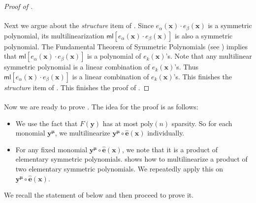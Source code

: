 \documentclass[11pt]{article}
\newcommand{\ml}{\mathsf{ml}}
\begin{document}
\begin{proof}[Proof of ]
\paragraph{}Next we argue about the \emph{structure} item of . Since $e_{\alpha}(\mathbf{x}) \cdot e_{\beta}(\mathbf{x})$ is a symmetric polynomial, its multilinearization $\ml[e_{\alpha}(\mathbf{x}) \cdot e_{\beta}(\mathbf{x})]$ is also a symmetric polynomial. The Fundamental Theorem of Symmetric Polynomials (see ) implies that $\ml[e_{\alpha}(\mathbf{x}) \cdot e_{\beta}(\mathbf{x})]$ is a polynomial of $e_{k}(\mathbf{x})$'s. Note that any multilinear symmetric polynomial is a linear combination of $e_{k}(\mathbf{x})$'s. Thus $\ml[e_{\alpha}(\mathbf{x}) \cdot e_{\beta}(\mathbf{x})]$ is a linear combination of $e_{k}(\mathbf{x})$'s. This finishes the \emph{structure} item of . This finishes the proof of .
\end{proof}




\paragraph{}Now we are ready to prove . The idea for the proof is as follows:
\begin{itemize}
    \item We use the fact that $F(\mathbf{y})$ has at most $\mathrm{poly}(n)$ sparsity. So for each monomial $\mathbf{y}^{\bm{\mu}}$, we multilinearize $\mathbf{y}^{\bm{\mu}} \circ \widehat{\mathbf{e}}(\mathbf{x})$ individually. 
    \item For any fixed monomial $\mathbf{y}^{\bm{\mu}} \circ \widehat{\mathbf{e}}(\mathbf{x})$, we note that it is a product of elementary symmetric polynomials.  shows how to multilinearize a product of two elementary symmetric polynomials. We repeatedly apply this on $\mathbf{y}^{\bm{\mu}} \circ \widehat{\mathbf{e}}(\mathbf{x})$.
\end{itemize}
We recall the statement of  below and then proceed to prove it.

\multsymposchar*
\end{document}
